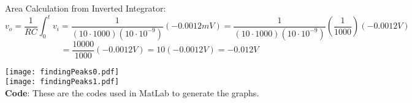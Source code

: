 \documentclass[11pt]{article}
\begin{document}
Area Calculation from Inverted Integrator:
\[v_o=\frac{1}{RC}\int^t_0v_i=\frac{1}{(10\cdot1000)(10\cdot10^{-9})}(-0.0012mV)=\frac{1}{(10\cdot1000)(10\cdot10^{-9})}(\frac{1}{1000})(-0.0012V)\]\[=\frac{10000}{1000}(-0.0012V)=10(-0.0012V)=-0.012V\]


\newpage
\begin{center}
    \texttt{[image: findingPeaks0.pdf]}\\
    \texttt{[image: findingPeaks1.pdf]}
    \\\textbf{Code}: These are the codes used in MatLab to generate the graphs.
\end{center}
\end{document}
